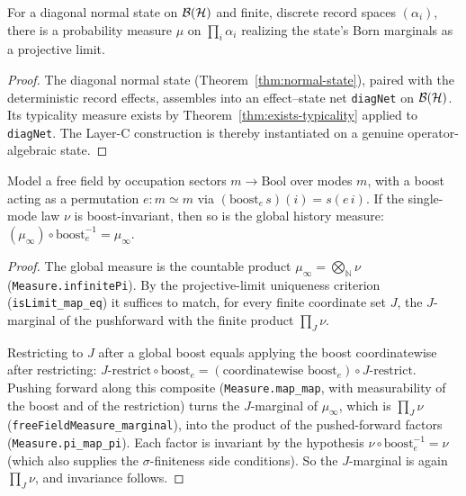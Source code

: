 \begin{theorem}
  \label{thm:bh-typicality}
  \leanok
  For a diagonal normal state on $\mathcal{B}(\mathcal{H})$ and finite, discrete record spaces
  $(\alpha_i)$, there is a probability measure $\mu$ on $\prod_i \alpha_i$ realizing
  the state's Born marginals as a projective limit.
\end{theorem}

\begin{proof}
  \leanok
  The diagonal normal state (Theorem~\ref{thm:normal-state}), paired with the
  deterministic record effects, assembles into an effect--state net
  \texttt{diagNet} on $\mathcal{B}(\mathcal{H})$. Its typicality measure exists by
  Theorem~\ref{thm:exists-typicality} applied to \texttt{diagNet}. The Layer-C
  construction is thereby instantiated on a genuine operator-algebraic state.
\end{proof}

\begin{theorem}
  \label{thm:freefield-boost}
  \leanok
  Model a free field by occupation sectors $m \to \mathrm{Bool}$ over modes $m$, with a
  boost acting as a permutation $e: m \simeq m$ via
  $(\mathrm{boost}_e\, s)(i) = s(e\,i)$. If the single-mode law $\nu$ is
  boost-invariant, then so is the global history measure:
  $(\mu_\infty)\circ \mathrm{boost}_e^{-1} = \mu_\infty$.
\end{theorem}

\begin{proof}
  \leanok
  The global measure is the countable product $\mu_\infty = \bigotimes_{\mathbb{N}}
  \nu$ (\texttt{Measure.infinitePi}). By the projective-limit uniqueness criterion
  (\texttt{isLimit\_map\_eq}) it suffices to match, for every finite coordinate set
  $J$, the $J$-marginal of the pushforward with the finite product $\prod_J \nu$.

  Restricting to $J$ after a global boost equals applying the boost coordinatewise
  after restricting: $J\text{-restrict} \circ \mathrm{boost}_e =
  (\text{coordinatewise } \mathrm{boost}_e) \circ J\text{-restrict}$. Pushing forward
  along this composite (\texttt{Measure.map\_map}, with measurability of the boost and
  of the restriction) turns the $J$-marginal of $\mu_\infty$, which is $\prod_J \nu$
  (\texttt{freeFieldMeasure\_marginal}), into the product of the pushed-forward factors
  (\texttt{Measure.pi\_map\_pi}). Each factor is invariant by the hypothesis
  $\nu\circ\mathrm{boost}_e^{-1} = \nu$ (which also supplies the $\sigma$-finiteness
  side conditions). So the $J$-marginal is again $\prod_J \nu$, and invariance
  follows.
\end{proof}


